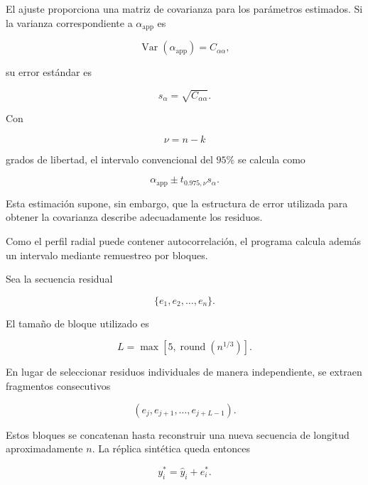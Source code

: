 El ajuste proporciona una matriz de covarianza para los parámetros estimados. Si la varianza correspondiente a $\alpha_{\mathrm{app}}$ es

\begin{equation}
\operatorname{Var}
(\alpha_{\mathrm{app}})
=
C_{\alpha\alpha},
\end{equation}

su error estándar es

\begin{equation}
s_\alpha
=
\sqrt{C_{\alpha\alpha}}.
\end{equation}

Con

\begin{equation}
\nu=n-k
\end{equation}

grados de libertad, el intervalo convencional del $95\%$ se calcula como

\begin{equation}
\alpha_{\mathrm{app}}
\pm
t_{0.975,\nu}s_\alpha.
\label{eq:CI_parametrico}
\end{equation}

Esta estimación supone, sin embargo, que la estructura de error utilizada para obtener la covarianza describe adecuadamente los residuos.

Como el perfil radial puede contener autocorrelación, el programa calcula además un intervalo mediante remuestreo por bloques.

Sea la secuencia residual

\begin{equation}
\{e_1,e_2,\ldots,e_n\}.
\end{equation}

El tamaño de bloque utilizado es

\begin{equation}
L
=
\max
\left[
5,
\operatorname{round}
\left(
n^{1/3}
\right)
\right].
\end{equation}

En lugar de seleccionar residuos individuales de manera independiente, se extraen fragmentos consecutivos

\begin{equation}
(e_j,e_{j+1},\ldots,e_{j+L-1}).
\end{equation}

Estos bloques se concatenan hasta reconstruir una nueva secuencia de longitud aproximadamente $n$. La réplica sintética queda entonces

\begin{equation}
y_i^{*}
=
\widehat{y}_i
+
e_i^{*}.
\end{equation}

